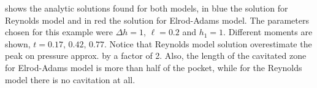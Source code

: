  shows the analytic solutions found for both models, in blue the solution for Reynolds model and in red the solution for Elrod-Adams model. The parameters chosen for this example were $\Delta h=1$, $\ell=0.2$ and $h_1=1$. Different moments are shown, $t=0.17,\,0.42,\,0.77$. Notice that Reynolds model solution overestimate the peak on pressure approx. by a factor of 2. Also, the length of the cavitated zone for Elrod-Adams model is more than half of the pocket, while for the Reynolds model there is no cavitation at all.
